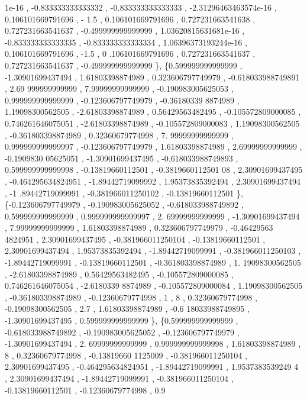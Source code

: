 \begin{DoxyCode}
      1e-16 , -0.833333333333332 , -0.833333333333333 , -2.31296463463574e-16 , 0.106101669791696 ,              -
      1.5 , 0.106101669791696 , 0.727231663541638 , 0.727231663541637 , -0.499999999999999 , 1.03620815631681e-16 
      , -0.833333333333335 , -0.833333333333334 , 1.06396373193244e-16 , 0.106101669791696 ,              -1.5 , 0
      .106101669791696 , 0.727231663541637 , 0.727231663541637 , -0.499999999999999 \},
\{0.599999999999999 , -1.30901699437494 ,  1.61803398874989 , 0.323606797749979 , -0.618033988749891 ,  2.69
      999999999999 ,  7.99999999999999 , -0.190983005625053 , 0.999999999999999 , -0.123606797749979 , -0.36180339
      8874989 ,  1.19098300562505 , -2.61803398874989 ,  0.56429563482495 , -0.105572809000085 , 0.746261646075051
       , -2.61803398874989 , -0.105572809000083 ,  1.19098300562505 , -0.361803398874989 ,  0.32360679774998 ,  7.
      99999999999999 , 0.999999999999997 , -0.123606797749979 ,  1.61803398874989 ,  2.69999999999999 , -0.1909830
      05625051 , -1.30901699437495 , -0.618033988749893 , 0.599999999999998 , -0.13819660112501 , -0.3819660112501
      08 ,  2.30901699437495 , -0.464295634824951 , -1.89442719099992 ,  1.95373835392494 ,  2.30901699437494 , -1
      .89442719099991 , -0.381966011250102 , -0.13819660112501 \},
\{-0.123606797749979 , -0.190983005625052 , -0.618033988749892 , 0.599999999999999 , 0.999999999999997 ,  2.
      69999999999999 , -1.30901699437494 ,  7.99999999999999 ,  1.61803398874989 , 0.323606797749979 , -0.46429563
      4824951 ,  2.30901699437495 , -0.381966011250104 , -0.13819660112501 ,  2.30901699437494 ,  1.95373835392494
       , -1.89442719099991 , -0.381966011250103 , -1.89442719099991 , -0.13819660112501 , -0.361803398874989 ,  1.
      19098300562505 , -2.61803398874989 ,  0.56429563482495 , -0.105572809000085 , 0.746261646075054 , -2.6180339
      8874989 , -0.105572809000084 ,  1.19098300562505 , -0.361803398874989 , -0.12360679774998 ,                 
      1 ,                 8 ,  0.32360679774998 , -0.19098300562505 ,               2.7 ,  1.61803398874989 , -0.6
      18033988749895 , -1.30901699437495 , 0.599999999999999 \},
\{0.599999999999999 , -0.618033988749892 , -0.190983005625052 , -0.123606797749979 , -1.30901699437494 ,  2.
      69999999999999 , 0.999999999999998 ,  1.61803398874989 ,                 8 ,  0.32360679774998 , -0.13819660
      1125009 , -0.381966011250104 ,  2.30901699437495 , -0.464295634824951 , -1.89442719099991 ,  1.9537383539249
      4 ,  2.30901699437494 , -1.89442719099991 , -0.381966011250104 , -0.13819660112501 , -0.12360679774998 , 0.9

\end{DoxyCode}
